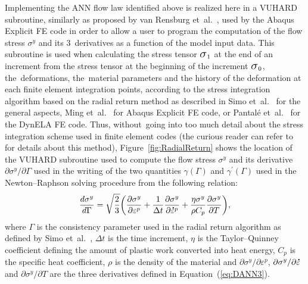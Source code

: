 \documentclass[algorithms,article,accept,pdftex,oneauthors]{Definitions/mdpi}
\DeclareRobustCommand{\Sig}{\mbox{\Large\ensuremath{\sigma}}}
\DeclareRobustCommand{\mdot}[1]{\accentset{\mbox{\bfseries .}}{#1}}
\begin{document}
Implementing the ANN flow law identified above is realized here in a VUHARD subroutine, similarly as proposed by van Rensburg et~al.~\cite{JansenVanRensburg-2012}, used by the Abaqus Explicit FE code in order to allow a user to program the computation of the flow stress $\sigma^y$ and its 3~derivatives as a function of the model input data.
This subroutine is used when calculating the stress tensor $\Sig_1$ at the end of an increment from the stress tensor at the beginning of the increment $\Sig_0$, the~deformations, the~material parameters and the history of the deformation at each finite element integration points, according to the stress integration algorithm based on the radial return method as described in Simo et~al.~\cite{Simo-1998} for the general aspects, Ming et~al.~\cite{Ming-2018} for Abaqus Explicit FE code, or Pantalé et~al.~\cite{Pantale-2004} for the DynELA FE code.
Thus, without~going into too much detail about the stress integration scheme used in finite element codes (the curious reader can refer to~\cite{Ponthot-2002, Ming-2018, Pantale-2004, Liang-2022} for details about this method), Figure~\ref{fig:RadialReturn} shows the location of the VUHARD subroutine used to compute the flow stress $\sigma^y$ and its derivative $\partial\sigma^y/\partial\Gamma$ used in the writing of the two quantities $\gamma(\Gamma)$ and $\gamma^{'}(\Gamma)$ used in the Newton--Raphson solving procedure from the following relation:
\begin{equation}
\frac{d\sigma^{y}}{d\Gamma} = \sqrt{\frac{2}{3}}\left(\frac{\partial\sigma^{y}}{\partial\varepsilon^{p}}+\frac{1}{\Delta t}\frac{\partial\sigma^{y}}{\partial\mdot{\varepsilon}^p}+\frac{\eta\sigma^{y}}{\rho C_{p}}\frac{\partial\sigma^{y}}{\partial T}\right)\label{eq:derivatives},
\end{equation}
where $\Gamma$ is the consistency parameter used in the radial return algorithm as defined by Simo et~al.~\cite{Simo-1998}, $\Delta t$ is the time increment, $\eta$ is the Taylor--Quinney coefficient defining the amount of plastic work converted into heat energy, $C_{p}$ is the specific heat coefficient, $\rho$ is the density of the material and $\partial \sigma^y/\partial\varepsilon^p$, $\partial \sigma^y/\partial\mdot\varepsilon$ and $\partial \sigma^y/\partial T$ are the three derivatives defined in Equation~(\ref{eq:DANN3}).
\end{document}
